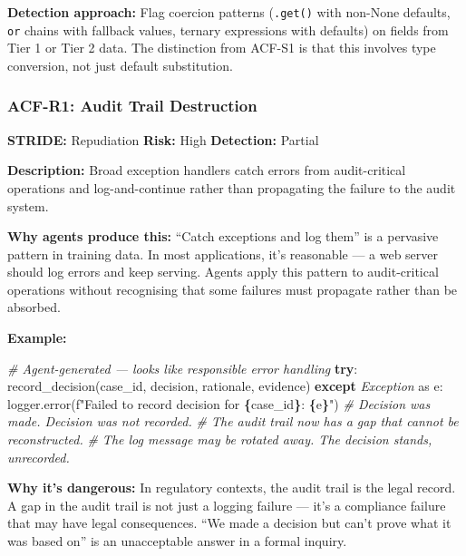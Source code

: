\documentclass[a4paper,11pt]{report}
\newenvironment{Shaded}{\begin{snugshade}}{\end{snugshade}}
\newcommand{\CommentTok}[1]{\textcolor[rgb]{0.56,0.35,0.01}{\textit{#1}}}
\newcommand{\ControlFlowTok}[1]{\textcolor[rgb]{0.13,0.29,0.53}{\textbf{#1}}}
\newcommand{\ImportTok}[1]{#1}
\newcommand{\NormalTok}[1]{#1}
\newcommand{\PreprocessorTok}[1]{\textcolor[rgb]{0.56,0.35,0.01}{\textit{#1}}}
\newcommand{\SpecialCharTok}[1]{\textcolor[rgb]{0.81,0.36,0.00}{\textbf{#1}}}
\newcommand{\SpecialStringTok}[1]{\textcolor[rgb]{0.31,0.60,0.02}{#1}}
\begin{document}
\textbf{Detection approach:} Flag coercion patterns (\texttt{.get()}
with non-None defaults, \texttt{or} chains with fallback values, ternary
expressions with defaults) on fields from Tier 1 or Tier 2 data. The
distinction from ACF-S1 is that this involves type conversion, not just
default substitution.

\hypertarget{acf-r1-audit-trail-destruction}{%
\subsubsection{ACF-R1: Audit Trail
Destruction}\label{acf-r1-audit-trail-destruction}}

\textbf{STRIDE:} Repudiation \textbar{} \textbf{Risk:} High \textbar{}
\textbf{Detection:} Partial

\textbf{Description:} Broad exception handlers catch errors from
audit-critical operations and log-and-continue rather than propagating
the failure to the audit system.

\textbf{Why agents produce this:} ``Catch exceptions and log them'' is a
pervasive pattern in training data. In most applications, it's
reasonable --- a web server should log errors and keep serving. Agents
apply this pattern to audit-critical operations without recognising that
some failures must propagate rather than be absorbed.

\textbf{Example:}

\begin{Shaded}
\begin{Highlighting}[]
\CommentTok{\# Agent{-}generated — looks like responsible error handling}
\ControlFlowTok{try}\NormalTok{:}
\NormalTok{    record\_decision(case\_id, decision, rationale, evidence)}
\ControlFlowTok{except} \PreprocessorTok{Exception} \ImportTok{as}\NormalTok{ e:}
\NormalTok{    logger.error(}\SpecialStringTok{f"Failed to record decision for }\SpecialCharTok{\{}\NormalTok{case\_id}\SpecialCharTok{\}}\SpecialStringTok{: }\SpecialCharTok{\{}\NormalTok{e}\SpecialCharTok{\}}\SpecialStringTok{"}\NormalTok{)}
    \CommentTok{\# Decision was made. Decision was not recorded.}
    \CommentTok{\# The audit trail now has a gap that cannot be reconstructed.}
    \CommentTok{\# The log message may be rotated away. The decision stands, unrecorded.}
\end{Highlighting}
\end{Shaded}

\textbf{Why it's dangerous:} In regulatory contexts, the audit trail is
the legal record. A gap in the audit trail is not just a logging failure
--- it's a compliance failure that may have legal consequences. ``We
made a decision but can't prove what it was based on'' is an
unacceptable answer in a formal inquiry.
\end{document}
